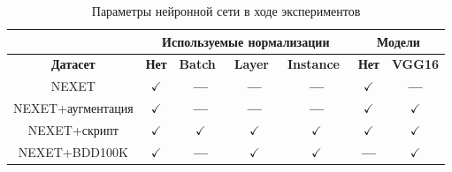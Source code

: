 \documentclass[11pt,a4paper]{extarticle}
\begin{document}
{			\begin{table}[h]
				\begin{tabular}{|c|c|c|c|c|c|c|}
					\hline
					\rowcolor[HTML]{AFD7AF} 
					\cellcolor[HTML]{EFEFEF}{\color[HTML]{CB0000} \textbf{Параметры обучения}} & \multicolumn{4}{c|}{\cellcolor[HTML]{AFD7AF}\textbf{Используемые нормализации}} & \multicolumn{2}{c|}{\cellcolor[HTML]{F7C7B1}\textbf{Модели}}     \\ \hline
					\rowcolor[HTML]{AFD7AF} 
					\cellcolor[HTML]{B6C0D0}\textbf{Датасет}                                   & \textbf{Нет}     & \textbf{Batch}~\cite{n_batch}    & \textbf{Layer}~\cite{n_layer}    & \textbf{Instance}~\cite{n_instance}    & \cellcolor[HTML]{F7C7B1}\textbf{Нет} & \cellcolor[HTML]{F7C7B1}\textbf{VGG16} \\ \hline
					\rowcolor[HTML]{EFEFEF} 
					NEXET                                                                      & $\checkmark$     & \textbf{---}      & \textbf{---}      & \textbf{---}         & $\checkmark$                         & \textbf{---}                           \\ \hline
					NEXET+аугментация                                                        & $\checkmark$     & \textbf{---}      & \textbf{---}      & \textbf{---}         & $\checkmark$                         & $\checkmark$                           \\ \hline
					\rowcolor[HTML]{EFEFEF} 
					NEXET+скрипт\footnotemark[2]                                                & $\checkmark$     & $\checkmark$      & $\checkmark$      & $\checkmark$         & $\checkmark$                         & $\checkmark$                           \\ \hline
					NEXET+BDD100K                                                              & $\checkmark$	     & \textbf{---}      & $\checkmark$        & $\checkmark$         & \textbf{---}                         & \cellcolor[HTML]{FFFFFF}$\checkmark$   \\ \hline
				\end{tabular}
				\caption{Параметры нейронной сети в ходе экспериментов}{
					\small{
					}
				}
				\label{tab:configs}
			\end{table}
			
}
\end{document}
